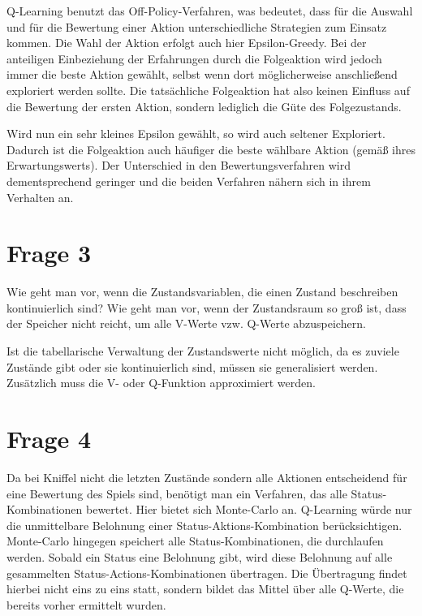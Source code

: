 \documentclass[10pt]{scrartcl}
\begin{document}
Q-Learning benutzt das Off-Policy-Verfahren, was bedeutet, dass für die Auswahl und für die Bewertung einer Aktion unterschiedliche Strategien zum Einsatz kommen. Die Wahl der Aktion erfolgt auch hier Epsilon-Greedy. Bei der anteiligen Einbeziehung der Erfahrungen durch die Folgeaktion wird jedoch immer die beste Aktion gewählt, selbst wenn dort möglicherweise anschließend exploriert werden sollte. Die tatsächliche Folgeaktion hat also keinen Einfluss auf die Bewertung der ersten Aktion, sondern lediglich die Güte des Folgezustands.

Wird nun ein sehr kleines Epsilon gewählt, so wird auch seltener Exploriert. Dadurch ist die Folgeaktion auch häufiger die beste wählbare Aktion (gemäß ihres Erwartungswerts). Der Unterschied in den Bewertungsverfahren wird dementsprechend geringer und die beiden Verfahren nähern sich in ihrem Verhalten an.

\section{Frage 3}
Wie geht man vor, wenn die Zustandsvariablen, die einen Zustand beschreiben kontinuierlich sind? Wie geht man vor, wenn der Zustandsraum so groß ist, dass der Speicher nicht reicht, um alle V-Werte vzw. Q-Werte abzuspeichern.

Ist die tabellarische Verwaltung der Zustandswerte nicht möglich, da es zuviele Zustände gibt oder sie kontinuierlich sind, müssen sie generalisiert werden. Zusätzlich muss die V- oder Q-Funktion approximiert werden.




\section{Frage 4}
Da bei Kniffel nicht die letzten Zustände sondern alle Aktionen entscheidend für eine Bewertung des Spiels sind, benötigt man ein Verfahren, das alle Status-Kombinationen bewertet. Hier bietet sich Monte-Carlo an. Q-Learning würde nur die unmittelbare Belohnung einer Status-Aktions-Kombination berücksichtigen.
Monte-Carlo hingegen speichert alle Status-Kombinationen, die durchlaufen
werden. Sobald ein Status eine Belohnung gibt, wird diese Belohnung auf alle gesammelten Status-Actions-Kombinationen übertragen. Die Übertragung findet hierbei nicht eins zu eins statt, sondern bildet das Mittel über alle Q-Werte, die bereits vorher ermittelt wurden.
\end{document}
